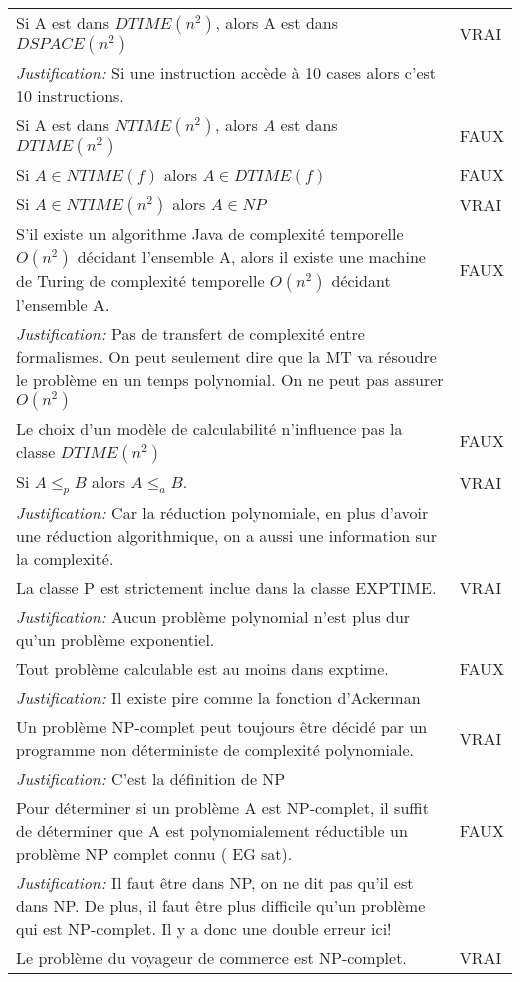 \begin{longtable}{p{13cm}|l}
    Si A est dans $DTIME(n^{2})$, alors A est dans $DSPACE(n^{2})$ & VRAI\\
       \textit{Justification:} Si une instruction accède à 10 cases alors c'est 10 instructions. \\
    \hline
    Si A est dans $NTIME(n^{2})$, alors $A$ est dans $DTIME(n^{2})$& FAUX \\
    \hline
    Si $A \in NTIME(f)$ alors $A\in DTIME(f)$ & FAUX \\
    \hline
    Si $A \in NTIME(n^{2})$ alors $A \in NP$ & VRAI \\
    \hline
    S'il existe un algorithme Java de complexité temporelle $O(n^{2})$ décidant l'ensemble A, alors il existe une machine de Turing de complexité temporelle $O(n^{2})$ décidant l'ensemble A.& FAUX \\
    \textit{Justification:} Pas de transfert de complexité entre formalismes. On peut seulement dire que la MT va résoudre le problème en un temps polynomial. On ne peut pas assurer $O(n^{2})$ & \\
    \hline
    Le choix d'un modèle de calculabilité n'influence pas la classe $DTIME(n^{2})$ & FAUX \\
    \hline
    Si $A \leq_{p} B$ alors $A \leq_{a} B$. & VRAI \\
    \textit{Justification:} Car la réduction polynomiale, en plus d’avoir une réduction algorithmique, on a aussi une information sur la complexité. & \\
    \hline
    La classe P est strictement inclue dans la classe EXPTIME. & VRAI \\
    \textit{Justification:} Aucun problème polynomial n’est plus dur qu’un problème exponentiel. & \\
    \hline
    Tout problème calculable est au moins dans exptime. & FAUX \\
       \textit{Justification:} Il existe pire comme la fonction d'Ackerman \\
    \hline
    Un problème NP-complet peut toujours être décidé par un programme non déterministe de complexité polynomiale. & VRAI \\
    \textit{Justification:} C'est la définition de NP & \\
    \hline
    Pour déterminer si un problème A est NP-complet, il suffit de déterminer que A est polynomialement réductible un problème NP complet connu ( EG sat).& FAUX \\
    \textit{Justification:} Il faut être dans NP, on ne dit pas qu’il est dans NP. De plus, il faut être plus difficile qu’un problème qui est NP-complet. Il y a donc une double erreur ici! & \\
    \hline
    Le problème du voyageur de commerce est NP-complet. & VRAI \\

\end{longtable}